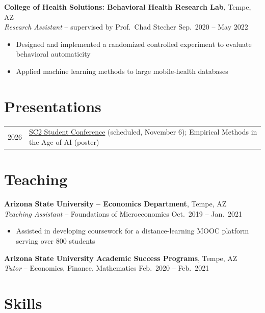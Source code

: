 \documentclass[line, margin, 10pt]{res}
\begin{document}
\begin{resume}
\vspace{4pt}

\textbf{College of Health Solutions: Behavioral Health Research Lab}, Tempe, AZ \\
\textit{Research Assistant} -- supervised by Prof.\ Chad Stecher
\hfill Sep.\ 2020 -- May 2022
\begin{itemize}
  \item Designed and implemented a randomized controlled experiment to evaluate
        behavioral automaticity
  \item Applied machine learning methods to large mobile-health databases
\end{itemize}

\section{\sc Presentations}
\begin{tabular}{@{}p{0.45in}p{4.95in}@{}}
2026 & \href{https://hai.stanford.edu/events/2026-sc2-student-conference}{SC2 Student Conference} (scheduled, November 6); Empirical Methods in the Age of AI (poster)
\end{tabular}

\section{\sc Teaching}

\textbf{Arizona State University -- Economics Department}, Tempe, AZ \\
\textit{Teaching Assistant} -- Foundations of Microeconomics
\hfill Oct.\ 2019 -- Jan.\ 2021
\begin{itemize}
  \item Assisted in developing coursework for a distance-learning MOOC platform
        serving over 800 students
\end{itemize}

\vspace{4pt}

\textbf{Arizona State University Academic Success Programs}, Tempe, AZ \\
\textit{Tutor} -- Economics, Finance, Mathematics
\hfill Feb.\ 2020 -- Feb.\ 2021

\section{\sc Skills}


\end{resume}
\end{document}
